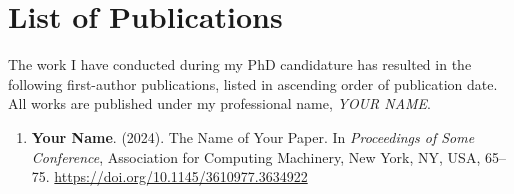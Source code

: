 \chapter*{List of Publications} \label{chap:publications}

The work I have conducted during my PhD candidature has resulted in the following first-author publications, listed in ascending order of publication date. All works are published under my professional name, \textit{YOUR NAME}.

\begin{enumerate}
    \item \textbf{Your Name}. (2024). The Name of Your Paper. In \textit{Proceedings of Some Conference}, Association for Computing Machinery, New York, NY, USA, 65–75. \hyperlink{https://doi.org/10.1145/3610977.3634922}{https://doi.org/10.1145/3610977.3634922}
\end{enumerate}